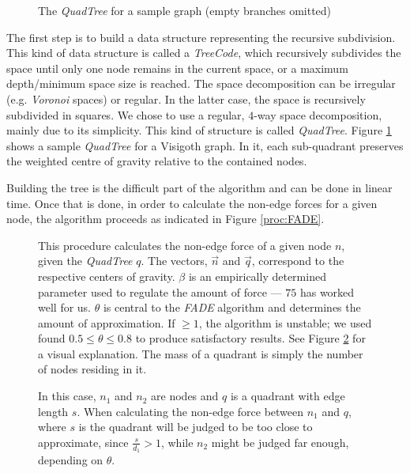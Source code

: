 \documentclass[a4paper,11pt,titlepage]{article}
\newcommand{\buzz}[1]{\emph{#1}}
\newcommand{\FADE}{\buzz{FADE} }
\begin{document}
\begin{figure}
  \centering
  \hspace{10pt}
  \caption{The \buzz{QuadTree} for a sample graph (empty branches
    omitted)}
  \label{fig:quadtree}
\end{figure}

The first step is to build a data structure representing the recursive
subdivision. This kind of data structure is called a \buzz{TreeCode},
which recursively subdivides the space until only one node remains in
the current space, or a maximum depth/minimum space size is
reached. The space decomposition can be irregular (e.g. \buzz{Voronoi}
spaces) or regular. In the latter case, the space is recursively
subdivided in squares. We chose to use a regular, $4$-way space
decomposition, mainly due to its simplicity. This kind of structure is
called \buzz{QuadTree}. Figure \ref{fig:quadtree} shows a sample
\buzz{QuadTree} for a Visigoth graph. In it, each sub-quadrant
preserves the weighted centre of gravity relative to the contained
nodes.

Building the tree is the difficult part of the algorithm and can be
done in linear time. Once that is done, in order to calculate the
non-edge forces for a given node, the algorithm proceeds as indicated
in Figure \ref{proc:FADE}.

\begin{figure}[ht]
  \begin{minipage}[b]{0.5\linewidth}
    
    \caption{This procedure calculates the non-edge force of a given
      node $n$, given the \buzz{QuadTree} $q$. The vectors, $\vec{n}$
      and $\vec{q}$, correspond to the respective centers of
      gravity. $\beta$ is an empirically determined parameter used to
      regulate the amount of force --- $75$ has worked well for
      us. $\theta$ is central to the \FADE algorithm and determines
      the amount of approximation. If $\geq 1$, the algorithm is
      unstable; we used found $0.5 \leq \theta \leq 0.8$ to produce
      satisfactory results. See Figure \ref{fig:theta} for a visual
      explanation. The mass of a quadrant is simply the number of
      nodes residing in it. }
    \label{proc:FADE}
  \end{minipage}
  \hspace{10pt}
  \begin{minipage}[b]{0.5\linewidth}
    \centering
    
    \caption{In this case, $n_1$ and $n_2$ are nodes and $q$ is a
      quadrant with edge length $s$. When calculating the non-edge
      force between $n_1$ and $q$, where $s$ is the quadrant will be
      judged to be too close to approximate, since $\frac{s}{d_1} >
      1$, while $n_2$ might be judged far enough, depending on
      $\theta$.}
    \label{fig:theta}
  \end{minipage}
\end{figure}
\end{document}
